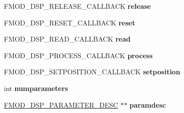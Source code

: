 \begin{DoxyCompactItemize}
\item 
\hypertarget{struct_f_m_o_d___d_s_p___d_e_s_c_r_i_p_t_i_o_n_a7a8a42bcbfec8068d462a63d6aa21dfa}{F\+M\+O\+D\+\_\+\+D\+S\+P\+\_\+\+R\+E\+L\+E\+A\+S\+E\+\_\+\+C\+A\+L\+L\+B\+A\+C\+K {\bfseries release}}\label{struct_f_m_o_d___d_s_p___d_e_s_c_r_i_p_t_i_o_n_a7a8a42bcbfec8068d462a63d6aa21dfa}

\item 
\hypertarget{struct_f_m_o_d___d_s_p___d_e_s_c_r_i_p_t_i_o_n_a8754cecb29633eac841bdb93193ac6f2}{F\+M\+O\+D\+\_\+\+D\+S\+P\+\_\+\+R\+E\+S\+E\+T\+\_\+\+C\+A\+L\+L\+B\+A\+C\+K {\bfseries reset}}\label{struct_f_m_o_d___d_s_p___d_e_s_c_r_i_p_t_i_o_n_a8754cecb29633eac841bdb93193ac6f2}

\item 
\hypertarget{struct_f_m_o_d___d_s_p___d_e_s_c_r_i_p_t_i_o_n_aaba9380bba61ae8e11ecd07832739778}{F\+M\+O\+D\+\_\+\+D\+S\+P\+\_\+\+R\+E\+A\+D\+\_\+\+C\+A\+L\+L\+B\+A\+C\+K {\bfseries read}}\label{struct_f_m_o_d___d_s_p___d_e_s_c_r_i_p_t_i_o_n_aaba9380bba61ae8e11ecd07832739778}

\item 
\hypertarget{struct_f_m_o_d___d_s_p___d_e_s_c_r_i_p_t_i_o_n_ac5963524abb4f794abf559d7af883cf6}{F\+M\+O\+D\+\_\+\+D\+S\+P\+\_\+\+P\+R\+O\+C\+E\+S\+S\+\_\+\+C\+A\+L\+L\+B\+A\+C\+K {\bfseries process}}\label{struct_f_m_o_d___d_s_p___d_e_s_c_r_i_p_t_i_o_n_ac5963524abb4f794abf559d7af883cf6}

\item 
\hypertarget{struct_f_m_o_d___d_s_p___d_e_s_c_r_i_p_t_i_o_n_a21b36a0279ec8eb785da5854a92b038e}{F\+M\+O\+D\+\_\+\+D\+S\+P\+\_\+\+S\+E\+T\+P\+O\+S\+I\+T\+I\+O\+N\+\_\+\+C\+A\+L\+L\+B\+A\+C\+K {\bfseries setposition}}\label{struct_f_m_o_d___d_s_p___d_e_s_c_r_i_p_t_i_o_n_a21b36a0279ec8eb785da5854a92b038e}

\item 
\hypertarget{struct_f_m_o_d___d_s_p___d_e_s_c_r_i_p_t_i_o_n_a6258ca66c8ed1583159b0a6d3bf05d68}{int {\bfseries numparameters}}\label{struct_f_m_o_d___d_s_p___d_e_s_c_r_i_p_t_i_o_n_a6258ca66c8ed1583159b0a6d3bf05d68}

\item 
\hypertarget{struct_f_m_o_d___d_s_p___d_e_s_c_r_i_p_t_i_o_n_ad04af03c4a86a1335dcc5dc611141b59}{\hyperlink{struct_f_m_o_d___d_s_p___p_a_r_a_m_e_t_e_r___d_e_s_c}{F\+M\+O\+D\+\_\+\+D\+S\+P\+\_\+\+P\+A\+R\+A\+M\+E\+T\+E\+R\+\_\+\+D\+E\+S\+C} $\ast$$\ast$ {\bfseries paramdesc}}\label{struct_f_m_o_d___d_s_p___d_e_s_c_r_i_p_t_i_o_n_ad04af03c4a86a1335dcc5dc611141b59}


\end{DoxyCompactItemize}
